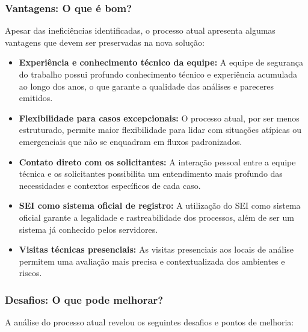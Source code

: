 \documentclass[12pt,a4paper]{article}
\begin{document}
\subsubsection{Vantagens: O que é bom?}
Apesar das ineficiências identificadas, o processo atual apresenta algumas vantagens que devem ser preservadas na nova solução:

\begin{itemize}
    \item \textbf{Experiência e conhecimento técnico da equipe:} A equipe de segurança do trabalho possui profundo conhecimento técnico e experiência acumulada ao longo dos anos, o que garante a qualidade das análises e pareceres emitidos.
    
    \item \textbf{Flexibilidade para casos excepcionais:} O processo atual, por ser menos estruturado, permite maior flexibilidade para lidar com situações atípicas ou emergenciais que não se enquadram em fluxos padronizados.
    
    \item \textbf{Contato direto com os solicitantes:} A interação pessoal entre a equipe técnica e os solicitantes possibilita um entendimento mais profundo das necessidades e contextos específicos de cada caso.
    
    \item \textbf{SEI como sistema oficial de registro:} A utilização do SEI como sistema oficial garante a legalidade e rastreabilidade dos processos, além de ser um sistema já conhecido pelos servidores.
    
    \item \textbf{Visitas técnicas presenciais:} As visitas presenciais aos locais de análise permitem uma avaliação mais precisa e contextualizada dos ambientes e riscos.
\end{itemize}

\subsubsection{Desafios: O que pode melhorar?}
A análise do processo atual revelou os seguintes desafios e pontos de melhoria:
\end{document}

